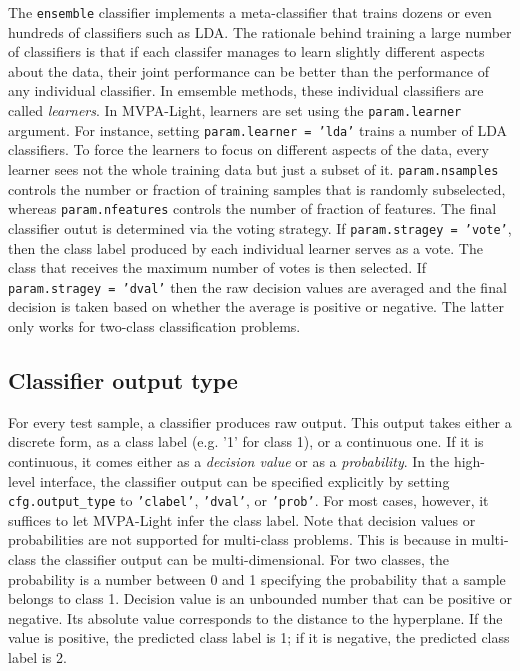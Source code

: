 \documentclass[utf8]{frontiersSCNS} %
\newcommand{\mvpa}{MVPA-Light}
\newcommand{\ttt}[1]{\texttt{#1}}
\begin{document}
The \ttt{ensemble} classifier implements a meta-classifier that trains dozens
or even hundreds of classifiers such as LDA. The rationale behind training a large number of classifiers is that if each classifer manages to learn slightly different aspects about the data, their joint performance can be better than the performance of any individual classifier.
In emsemble methods, these individual classifiers are called \textit{learners}. In \mvpa{}, learners are set using the \ttt{param.learner} argument. For instance, setting \ttt{param.learner = 'lda'} trains a number of LDA classifiers. To force the learners to focus on different aspects of the data, every learner sees not the whole training data but just a subset of it. \ttt{param.nsamples} controls the number or fraction of training samples that is randomly subselected, whereas \ttt{param.nfeatures} controls the number of fraction of features.
The final classifier outut is determined via the voting strategy. If \ttt{param.stragey = 'vote'}, then the class label produced by each individual learner serves as a vote. The class that receives the maximum number of votes is then selected. If \ttt{param.stragey = 'dval'}  then the raw decision values are averaged and the final decision is taken based on whether the average is positive or negative. The latter only works for two-class classification problems.

\subsection{Classifier output type}\label{sec:output}

For every test sample, a classifier produces raw output. This output takes either a discrete form, as a class label (e.g. '1' for class 1), or a continuous one. If it is continuous, it comes either as a \textit{decision value} or as a \textit{probability}.
In the high-level interface, the classifier output can be specified explicitly by setting \ttt{cfg.output\_type} to \ttt{'clabel'}, \ttt{'dval'}, or \ttt{'prob'}. For most cases, however, it suffices to let \mvpa{} infer the class label. Note that decision values or probabilities are not supported for multi-class problems. This is because in multi-class the classifier output can be multi-dimensional. For two classes, the probability is a number between 0 and 1 specifying the probability that a sample belongs to class 1. Decision value is an unbounded number that can be positive or negative. Its absolute value corresponds to the distance to the hyperplane.
 If the value is positive, the predicted class label is 1; if it is negative, the predicted class label is 2.
\end{document}
